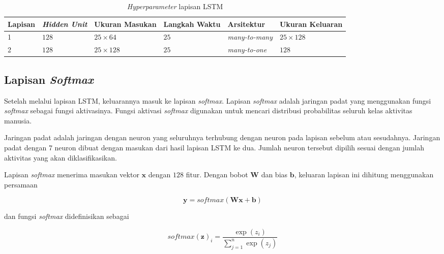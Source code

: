\begin{table}[h!]
    \centering
    \caption{\textit{Hyperparameter} lapisan LSTM}
    \begin{tabular}{ |p{1.5cm}|p{1.5cm}|p{2cm}|p{1.7cm}|p{2.5cm}|p{2cm}| }
        \hline
        \textbf{Lapisan} & \textbf{\textit{Hidden Unit}} & \textbf{Ukuran Masukan} & \textbf{Langkah Waktu} & \textbf{Arsitektur} & \textbf{Ukuran Keluaran} \\

        \hline
        1 & $128$ & $25 \times 64$ & $25$ & \textit{many-to-many} & $25 \times 128$ \\

        \hline
        2 & $128$ & $25 \times 128$ & $25$ & \textit{many-to-one} & $128$ \\

        \hline
    \end{tabular}
    \label{table:hyperparameter-lapisan-lstm}
\end{table}

\subsection{Lapisan \textit{Softmax}}
Setelah melalui lapisan LSTM, keluarannya masuk ke lapisan \textit{softmax}. Lapisan \textit{softmax} adalah jaringan padat yang menggunakan fungsi \textit{softmax} sebagai fungsi aktivasinya. Fungsi aktivasi \textit{softmax} digunakan untuk mencari distribusi probabilitas seluruh kelas aktivitas manusia.

Jaringan padat adalah jaringan dengan neuron yang seluruhnya terhubung dengan neuron pada lapisan sebelum atau sesudahnya. Jaringan padat dengan 7 neuron dibuat dengan masukan dari hasil lapisan LSTM ke dua. Jumlah neuron tersebut dipilih sesuai dengan jumlah aktivitas yang akan diklasifikasikan.

Lapisan \textit{softmax} menerima masukan vektor $\pmb{x}$ dengan $128$ fitur. Dengan bobot $\pmb{W}$ dan bias $\pmb{b}$, keluaran lapisan ini dihitung menggunakan persamaan

\begin{equation}
    \pmb{y} = softmax(\pmb{W} \pmb{x} + \pmb{b})
\end{equation}

\noindent
dan fungsi \textit{softmax} didefinisikan sebagai

\begin{equation}
    softmax(\pmb{z})_i = \frac{\exp(z_i)}{\sum_{j=1}^n \exp(z_j)}
\end{equation}

